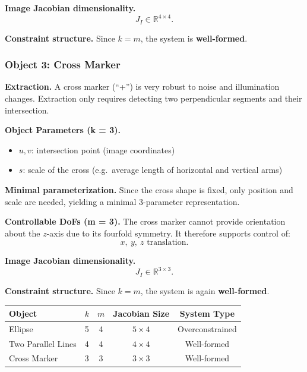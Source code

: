 \documentclass[a4paper,12pt]{article}
\begin{document}
\textbf{Image Jacobian dimensionality.}
\[
J_I \in \mathbb{R}^{4 \times 4}.
\]

\textbf{Constraint structure.}
Since $k = m$, the system is \textbf{well-formed}.

\subsubsection*{Object 3: Cross Marker}

\textbf{Extraction.}
A cross marker (“+”) is very robust to noise and illumination changes.
Extraction only requires detecting two perpendicular segments and their
intersection.

\textbf{Object Parameters (k = 3).}
\begin{itemize}
    \item $u, v$: intersection point (image coordinates)
    \item $s$: scale of the cross (e.g.\ average length of horizontal and vertical arms)
\end{itemize}

\textbf{Minimal parameterization.}
Since the cross shape is fixed, only position and scale are needed, yielding a
minimal 3-parameter representation.

\textbf{Controllable DoFs (m = 3).}
The cross marker cannot provide orientation about the $z$-axis due to its
fourfold symmetry.  
It therefore supports control of:
\[
x,\ y,\ z \text{ translation}.
\]

\textbf{Image Jacobian dimensionality.}
\[
J_I \in \mathbb{R}^{3 \times 3}.
\]

\textbf{Constraint structure.}
Since $k = m$, the system is again \textbf{well-formed}.

\begin{center}
\begin{tabular}{lcccc}
\hline
Object & $k$ & $m$ & Jacobian Size & System Type \\
\hline
Ellipse              & 5 & 4 & $5 \times 4$ & Overconstrained \\
Two Parallel Lines   & 4 & 4 & $4 \times 4$ & Well-formed \\
Cross Marker         & 3 & 3 & $3 \times 3$ & Well-formed \\
\hline
\end{tabular}
\end{center}
\end{document}
